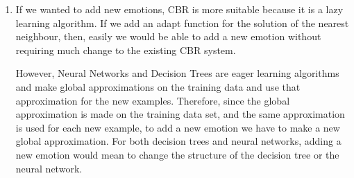 \documentclass[a4paper,12pt,oneside,final]{report}
\begin{document}
\begin{enumerate}
\item If we wanted to add new emotions, CBR is more suitable because it is a lazy learning algorithm.  If we add an adapt function for the solution of the nearest neighbour, then, easily we would be able to add a new emotion without requiring much change to the existing CBR system.
    
However, Neural Networks and Decision Trees are eager learning algorithms and make global approximations on the training data and use that approximation for the new examples. Therefore, since the global approximation is made on the training data set, and the same approximation is used for each new example, to add a new emotion we have to make a new global approximation.  For both decision trees and neural networks, adding a new emotion would mean to change the structure of the decision tree or the neural network.
\end{enumerate}




\begin{appendices}

\end{appendices}
\end{document}
